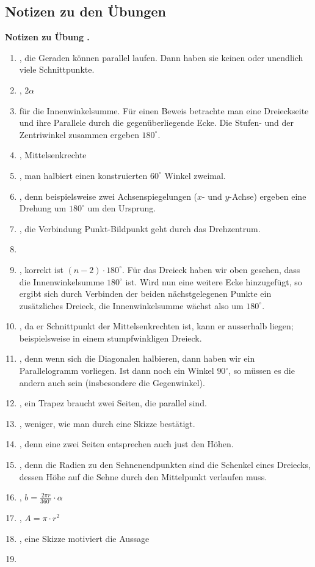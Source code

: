 \documentclass[%
11pt,%
twoside,%
titlepage,%
swissgerman,%
headsepline%
]{scrartcl}
\newcommand{\faReturnGray}{\textcolor{gray}{\faMailReply}} %
\theoremstyle{definition}
\theoremstyle{plain}
\newcommand{\concatueb}[1]{ueb:#1}%
\newcommand{\concatlsg}[1]{lsg:#1}%
\newcounter{uebcounter}[section]
\renewcommand{\theuebcounter}{\thesection.\arabic{uebcounter}}  %
\newenvironment{lsg}[1]{%
    \par\noindent\textbf{Notizen zu Übung \theuebcounter\label{\concatlsg{#1}}}
    \hfill\hyperref[\concatueb{#1}]{\faReturnGray}\par %
}{%
    \par%
}
\begin{document}
\clearpage

\subsection{Notizen zu den Übungen}

\begin{lsg}{testfragen}
    \begin{enumerate}
        \item {}, die Geraden können parallel laufen. Dann haben sie keinen oder unendlich viele Schnittpunkte.
        \item {}, $2\alpha$
        \item {} für die Innenwinkelsumme. Für einen Beweis betrachte man eine Dreieckseite und ihre Parallele durch die gegenüberliegende Ecke. Die Stufen- und der Zentriwinkel zusammen ergeben $180^\circ$.
        \item {}, Mittelsenkrechte
        \item {}, man halbiert einen konstruierten $60^\circ$ Winkel zweimal.
        \item {}, denn beispielsweise zwei Achsenspiegelungen ($x$- und $y$-Achse) ergeben eine Drehung um $180^\circ$ um den Ursprung.
        \item {}, die Verbindung Punkt-Bildpunkt geht durch das Drehzentrum.
        \item {}
        \item {}, korrekt ist $(n-2)\cdot180^\circ$. Für das Dreieck haben wir oben gesehen, dass die Innenwinkelsumme $180^\circ$ ist. Wird nun eine weitere Ecke hinzugefügt, so ergibt sich durch Verbinden der beiden nächstgelegenen Punkte ein zusätzliches Dreieck, die Innenwinkelsumme wächst also um $180^\circ$.
        \item {}, da er Schnittpunkt der Mittelsenkrechten ist, kann er ausserhalb liegen; beispielsweise in einem stumpfwinkligen Dreieck.
        \item {}, denn wenn sich die Diagonalen halbieren, dann haben wir ein Parallelogramm vorliegen. Ist dann noch ein Winkel $90^\circ$, so müssen es die andern auch sein (insbesondere die Gegenwinkel).
        \item {}, ein Trapez braucht zwei Seiten, die parallel sind.
        \item {}, weniger, wie man durch eine Skizze bestätigt.
        \item {}, denn eine zwei Seiten entsprechen auch just den Höhen.
        \item {}, denn die Radien zu den Sehnenendpunkten sind die Schenkel eines Dreiecks, dessen Höhe auf die Sehne durch den Mittelpunkt verlaufen muss.
        \item {}, $b=\frac{2\pi r}{360^\circ}\cdot \alpha$
        \item {}, $A=\pi\cdot r^2$
        \item {}, eine Skizze motiviert die Aussage
        \item {}
        

\end{enumerate}
\end{lsg}
\end{document}
